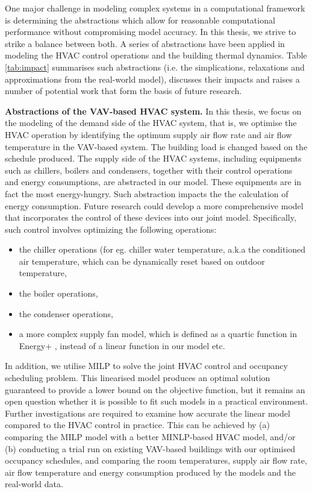 One major challenge in modeling complex systems in a computational framework is determining the abstractions which allow for reasonable computational performance without compromising model accuracy. In this thesis, we strive to strike a balance between both. A series of abstractions have been applied in modeling the HVAC control operations and the building thermal dynamics. Table \ref{tab:impact} summarises such abstractions (i.e. the simplications, relaxations and approximations from the real-world model), discusses their impacts and raises a number of potential work that form the basis of future research.



\textbf{Abstractions of the VAV-based HVAC system.} In this thesis, we focus on the modeling of the demand side of the HVAC system, that is, we optimise the HVAC operation by identifying the optimum supply air flow rate and air flow temperature in the VAV-based system. The building load is changed based on the schedule produced. The supply side of the HVAC systems, including equipments such as chillers, boilers and condensers, together with their control operations and energy consumptions, are abstracted in our model. These equipments are in fact the most energy-hungry. Such abstraction impacts the the calculation of energy consumption. Future research could develop a more comprehensive model that incorporates the control of these devices into our joint model. Specifically, such control involves optimizing the following operations:
\begin{itemize}
	\item the chiller operations (for eg. chiller water temperature, a.k.a the conditioned air temperature, which can be dynamically reset based on outdoor temperature, 
	\item the boiler operations,
	\item the condenser operations,
	\item a more complex supply fan model, which is defined as a quartic function in Energy+ \citep{crawley2000energyplus}, instead of a linear function in our model etc.
\end{itemize}
 
In addition, we utilise MILP to solve the joint HVAC control and occupancy scheduling problem. This linearised model produces an optimal solution guaranteed to provide a lower bound on the objective function, but it remains an open question whether it is possible to fit such models in a practical environment. Further investigations are required to examine how accurate the linear model compared to the HVAC control in practice. This can be achieved by (a) comparing the MILP model with a better MINLP-based HVAC model, and/or (b) conducting a trial run on existing VAV-based buildings with our optimised occupancy schedules, and comparing the room temperatures, supply air flow rate, air flow temperature and energy consumption produced by the models and the real-world data. %

